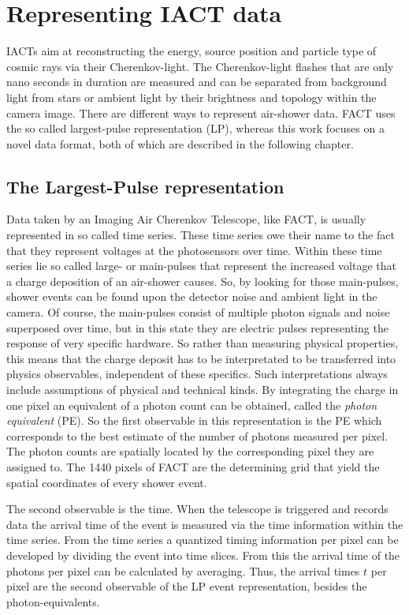 \chapter{Representing IACT data}
%
IACTs aim at reconstructing the energy, source position and particle type of
cosmic rays via their Cherenkov-light. The Cherenkov-light flashes that are
only nano seconds in duration are measured and can be separated from background
light from stars or ambient light by their brightness and topology within the
camera image. There are different ways to represent air-shower data. FACT uses
the so called largest-pulse representation (LP), whereas this work focuses on a novel
data format, both of which are described in the following chapter.

\section{The Largest-Pulse representation}
%
Data taken by an Imaging Air Cherenkov Telescope, like FACT, is usually represented in so called time series.
These time series owe their name to the fact that they represent voltages at
the photosensors over time. Within these time series lie so called large- or main-pulses
that represent the increased voltage that a charge deposition of an air-shower
causes. So, by looking for those main-pulses, shower events can be found upon
the detector noise and ambient light in the camera. Of course, the main-pulses
consist of multiple photon signals and noise superposed over time, but in this
state they are electric pulses representing the response of very specific
hardware. So rather than measuring physical properties, this means that the
charge deposit has to be interpretated to be transferred into physics
observables, independent of these specifics.
Such interpretations always include assumptions of physical and technical
kinds. By integrating the charge in one pixel an equivalent of a photon count
can be obtained, called the \textit{photon equivalent} (PE). So the first
observable in this representation is the PE which corresponds to the best
estimate of the number of photons measured per pixel. The photon counts are
spatially located by the corresponding pixel they are assigned to. The 1440
pixels of FACT are the determining grid that yield the spatial coordinates of
every shower event.

The second observable is the time. When the telescope is triggered and records
data the arrival time of the event is measured via the time information within
the time series. From the time series a quantized timing information per pixel
can be developed by dividing the event into time slices. From this the arrival
time of the photons per pixel can be calculated by averaging. Thus, the arrival
times $t$ per pixel are the second observable of the LP event
representation, besides the photon-equivalents.

